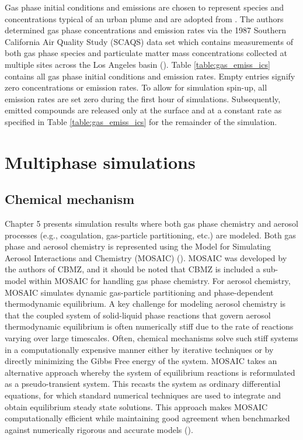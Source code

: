 Gas phase initial conditions and emissions are chosen to represent species and concentrations typical of an urban plume and are adopted from \cite{riemer_simulating_2009}. The authors determined gas phase concentrations and emission rates via the 1987 Southern California Air Quality Study (SCAQS) data set which contains measurements of both gas phase species and particulate matter mass concentrations collected at multiple sites across the Los Angeles basin (\cite{zaveri_model_2008}). Table \ref{table:gas_emiss_ics} contains all gas phase initial conditions and emission rates. Empty entries signify zero concentrations or emission rates. To allow for simulation spin-up, all emission rates are set zero during the first hour of simulations. Subsequently, emitted compounds are released only at the surface and at a constant rate as specified in Table \ref{table:gas_emiss_ics} for the remainder of the simulation.



\section{Multiphase simulations}
\subsection{Chemical mechanism}
Chapter 5 presents simulation results where both gas phase chemistry and aerosol processes (e.g., coagulation, gas-particle partitioning, etc.) are modeled. Both gas phase and aerosol chemistry is represented using the Model for Simulating Aerosol Interactions and Chemistry (MOSAIC) (\cite{zaveri_model_2008}). MOSAIC was developed by the authors of CBMZ, and it should be noted that CBMZ is included a sub-model within MOSAIC for handling gas phase chemistry. For aerosol chemistry, MOSAIC simulates dynamic gas-particle partitioning and phase-dependent thermodynamic equilibrium. A key challenge for modeling aerosol chemistry is that the coupled system of solid-liquid phase reactions that govern aerosol thermodynamic equilibrium is often numerically stiff due to the rate of reactions varying over large timescales. Often, chemical mechanisms solve such stiff systems in a computationally expensive manner either by iterative techniques or by directly minimizing the Gibbs Free energy of the system. MOSAIC takes an alternative approach whereby the system of equilibrium reactions is reformulated as a pseudo-transient system. This recasts the system as ordinary differential equations, for which standard numerical techniques are used to integrate and obtain equilibrium steady state solutions. This approach makes MOSAIC computationally efficient while maintaining good agreement when benchmarked against numerically rigorous and accurate models (\cite{zaveri_model_2008}).


